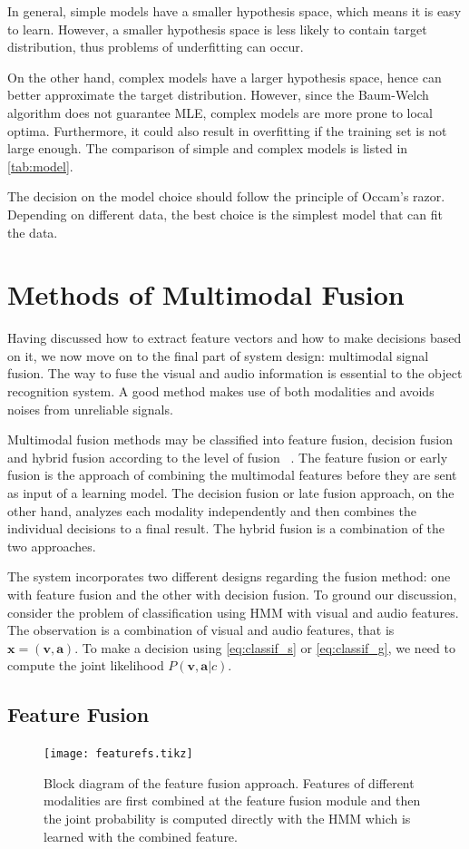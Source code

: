\documentclass[letterpaper, 10 pt, conference]{ieeeconf}
\begin{document}
In general, simple models have a smaller hypothesis space, which means it is easy to learn. However, a smaller hypothesis space is less likely to contain target distribution, thus problems of underfitting can occur.

On the other hand, complex models have a larger hypothesis space, hence can better approximate the target distribution. However, since the Baum-Welch algorithm does not guarantee MLE, complex models are more prone to local optima. Furthermore, it could also result in overfitting if the training set is not large enough. The comparison of simple and complex models is listed in \cref{tab:model}.

The decision on the model choice should follow the principle of Occam's razor. Depending on different data, the best choice is the simplest model that can fit the data.

\section{Methods of Multimodal Fusion}
Having discussed how to extract feature vectors and how to make decisions based on it, we now move on to the final part of system design: multimodal signal fusion. The way to fuse the visual and audio information is essential to the object recognition system. A good method makes use of both modalities and avoids noises from unreliable signals.

Multimodal fusion methods may be classified into feature fusion, decision fusion and hybrid fusion according to the level of fusion ~\cite{atrey_multimodal_2010}. The feature fusion or early fusion is the approach of combining the multimodal features before they are sent as input of a learning model. The decision fusion or late fusion approach, on the other hand, analyzes each modality independently and then combines the individual decisions to a final result. The hybrid fusion is a combination of the two approaches.

The system incorporates two different designs regarding the fusion method: one with feature fusion and the other with decision fusion. To ground our discussion, consider the problem of classification using HMM with visual and audio features. The observation is a combination of visual and audio features, that is $\mathbf{x} = (\mathbf{v}, \mathbf{a})$. To make a decision using \cref{eq:classif_s} or \cref{eq:classif_g}, we need to compute the joint likelihood $P(\mathbf{v},\mathbf{a}|c)$.

\subsection{Feature Fusion}
\begin{figure}[t]
  \footnotesize
  \centering
  \texttt{[image: featurefs.tikz]}
  \caption[Block diagram of the feature fusion approach.]{Block diagram of the feature fusion approach. Features of different modalities are first combined at the feature fusion module and then the joint probability is computed directly with the HMM which is learned with the combined feature.}
  \label{fig:featuref}
\end{figure}
\end{document}
